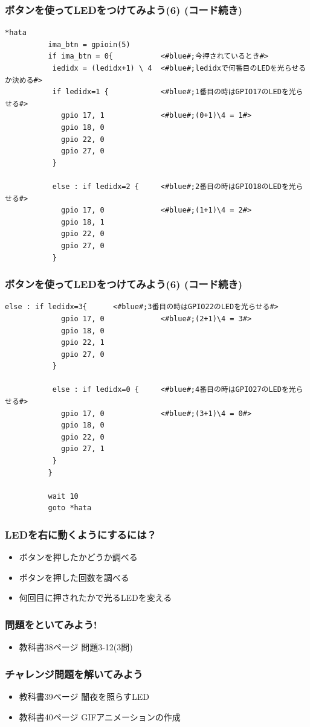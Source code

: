 \begin{frame}[fragile]
  \frametitle{ボタンを使ってLEDをつけてみよう(6) (コード続き)}
  \begin{lstlisting}[title=button\_led3.hsp, label=button_led3.hsp]
  *hata
          ima_btn = gpioin(5)
          if ima_btn = 0{           <#blue#;今押されているとき#>
           iedidx = (ledidx+1) \ 4  <#blue#;ledidxで何番目のLEDを光らせるか決める#>
           if ledidx=1 {            <#blue#;1番目の時はGPIO17のLEDを光らせる#>
             gpio 17, 1             <#blue#;(0+1)\4 = 1#>
             gpio 18, 0 
             gpio 22, 0
             gpio 27, 0
           }

           else : if ledidx=2 {     <#blue#;2番目の時はGPIO18のLEDを光らせる#>
             gpio 17, 0             <#blue#;(1+1)\4 = 2#>
             gpio 18, 1
             gpio 22, 0
             gpio 27, 0
           }
  \end{lstlisting}
\end{frame}

\begin{frame}[fragile]
  \frametitle{ボタンを使ってLEDをつけてみよう(6) (コード続き)}
  \begin{lstlisting}[title=button\_led3.hsp, label=button_led3.hsp]
           else : if ledidx=3{      <#blue#;3番目の時はGPIO22のLEDを光らせる#>
             gpio 17, 0             <#blue#;(2+1)\4 = 3#>
             gpio 18, 0
             gpio 22, 1
             gpio 27, 0
           }

           else : if ledidx=0 {     <#blue#;4番目の時はGPIO27のLEDを光らせる#>
             gpio 17, 0             <#blue#;(3+1)\4 = 0#>
             gpio 18, 0
             gpio 22, 0
             gpio 27, 1
           }
          }

          wait 10
          goto *hata
  \end{lstlisting}
\end{frame}

\begin{frame}
  \frametitle{LEDを右に動くようにするには？}
  \begin{itemize}
    \item ボタンを押したかどうか調べる
    \item ボタンを押した回数を調べる
    \item 何回目に押されたかで光るLEDを変える
  \end{itemize}
\end{frame}

\begin{frame}
  \frametitle{問題をといてみよう!}
  \begin{itemize}
    \item 教科書38ページ 問題3-12(3問)
  \end{itemize}
\end{frame}

\begin{frame}
  \frametitle{チャレンジ問題を解いてみよう}
  \begin{itemize}
    \item 教科書39ページ 闇夜を照らすLED
    \item 教科書40ページ GIFアニメーションの作成
  \end{itemize}
\end{frame}